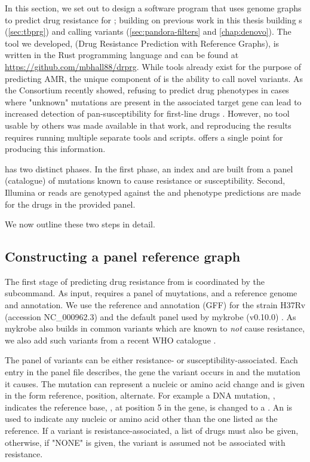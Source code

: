 In this section, we set out to design a software program that uses genome graphs to predict drug resistance for \mtb{}; building on previous work in this thesis building \mtb{} \prg{}s (\autoref{sec:tbprg}) and calling variants (\autoref{sec:pandora-filters} and \autoref{chap:denovo}). The tool we developed, \drprg{} (Drug Resistance Prediction with Reference Graphs), is written in the Rust programming language and can be found at \url{https://github.com/mbhall88/drprg}.
While tools already exist for the purpose of predicting AMR, the unique component of \drprg{} is the ability to call novel variants. As the \cryptic{} Consortium recently showed, refusing to predict drug phenotypes in cases where "unknown" mutations are present in the associated target gene can lead to increased detection of pan-susceptibility for first-line drugs \cite{cryptic2018}. However, no tool usable by others was made available in that work, and reproducing the results requires running multiple separate tools and scripts. \drprg{} offers a single point for producing this information.

\drprg{} has two distinct phases. In the first phase, an index and \prg{} are built from a panel (catalogue) of mutations known to cause resistance or susceptibility. Second, Illumina or \ont{} reads are genotyped against the \prg{} and phenotype predictions are made for the drugs in the provided panel.

We now outline these two steps in detail.

\subsection{Constructing a panel reference graph}
\label{sec:drprg-index}

The first stage of predicting drug resistance from \drprg{} is coordinated by the  subcommand. As input,  requires a panel of muytations, and a reference genome and annotation. We use the reference and annotation (GFF) for the \mtb{} strain H37Rv (accession NC\_000962.3) and the default panel used by mykrobe (v0.10.0) \cite{hunt2019}. As mykrobe also builds in common variants which are known to \emph{not} cause resistance, we also add such variants from a recent WHO catalogue \cite{whopanel2021}. 

The panel of variants can be either resistance- or susceptibility-associated. Each entry in the panel file describes, the gene the variant occurs in and the mutation it causes. The mutation can represent a nucleic or amino acid change and is given in the form reference, position, alternate. For example a DNA mutation, , indicates the reference base, , at position 5 in the gene, is changed to a . An  is used to indicate any nucleic or amino acid other than the one listed as the reference. If a variant is resistance-associated, a list of drugs must also be given, otherwise, if "NONE" is given, the variant is assumed not be associated with resistance.

